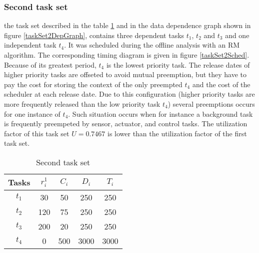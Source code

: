 \documentclass[conference,compsocconf]{IEEEtran}
\begin{document}




\subsubsection{Second task set}

the task set described in the table \ref{taskSet2Table} and in the data dependence graph shown in figure \ref{taskSet2DepGraph}, contains three dependent tasks $t_1$, $t_2$ and $t_3$ and one independent task $t_4$. It was scheduled during the offline analysis with an RM algorithm. The corresponding timing diagram is given in figure \ref{taskSet2Sched}. Because of its greatest period, $t_4$ is the lowest priority task. The release dates of higher priority tasks are offseted to avoid mutual preemption, but they have to pay the cost for storing the context of the only preempted $t_4$ and the cost of the scheduler at each release date. Due to this configuration (higher priority tasks are more frequently released than the low priority task $t_4$) several preemptions occurs for one instance of $t_4$. Such situation occurs when for instance a background task is frequently preempeted by  sensor, actuator, and control tasks. The utilization factor of this task set $U=0.7467$ is lower than the utilization factor of the first task set.  



\begin{table}
\caption{Second task set}
\label{taskSet2Table}
\begin{center}
\begin{tabular}{|c|c|c|c|c|}
\hline
\textbf{Tasks} & \textbf{$r_i^1$} & \textbf{$C_i$} & \textbf{$D_i$} & \textbf{$T_i$}  \\
\hline
$t_1$& 30 & 50 & 250  & 250\\
\hline
$t_2$& 120 & 75 & 250  & 250\\
\hline
$t_3$& 200  & 20 & 250  & 250\\
\hline
$t_4$& 0  & 500 & 3000  & 3000\\
\hline
\end{tabular}
\end{center}
\end{table}
\end{document}
